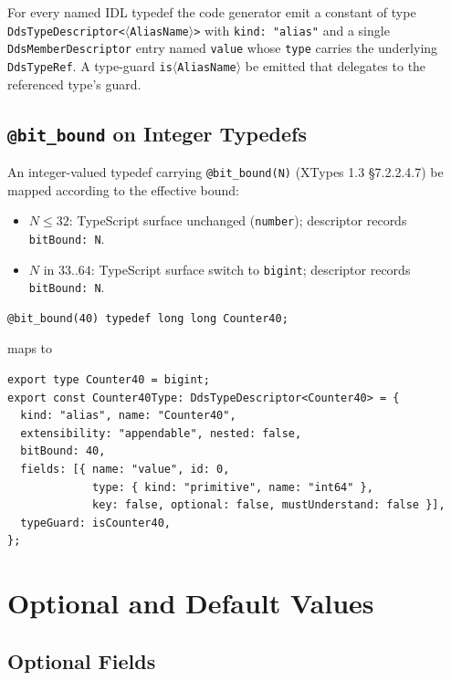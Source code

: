 \documentclass{../styles/zerodds-vendor-spec}
\begin{document}
For every named IDL typedef the code generator 
emit a constant of type
\texttt{DdsTypeDescriptor<$\langle$AliasName$\rangle$>} with
\texttt{kind:\,"alias"} and a single
\texttt{DdsMemberDescriptor} entry named \texttt{value} whose
\texttt{type} carries the underlying \texttt{DdsTypeRef}. A
type-guard \texttt{is$\langle$AliasName$\rangle$} 
be emitted that delegates to the referenced type's guard.

\subsection{\texttt{@bit\_bound} on Integer Typedefs}\label{sec:bit-bound-typedef}

An integer-valued typedef carrying \texttt{@bit\_bound(N)} (XTypes
1.3 §7.2.2.4.7)  be mapped according to the effective
bound:

\begin{itemize}[noitemsep]
  \item $N \leq 32$: TypeScript surface unchanged
        (\texttt{number}); descriptor records \texttt{bitBound:\,N}.
  \item $N$ in $33..64$: TypeScript surface  switch
        to \texttt{bigint}; descriptor records \texttt{bitBound:\,N}.
\end{itemize}

\begin{specexample}
\begin{lstlisting}
@bit_bound(40) typedef long long Counter40;
\end{lstlisting}
maps to
\begin{lstlisting}
export type Counter40 = bigint;
export const Counter40Type: DdsTypeDescriptor<Counter40> = {
  kind: "alias", name: "Counter40",
  extensibility: "appendable", nested: false,
  bitBound: 40,
  fields: [{ name: "value", id: 0,
             type: { kind: "primitive", name: "int64" },
             key: false, optional: false, mustUnderstand: false }],
  typeGuard: isCounter40,
};
\end{lstlisting}
\end{specexample}

\section{Optional and Default Values}\label{sec:optional-defaults}

\subsection{Optional Fields}
\end{document}
